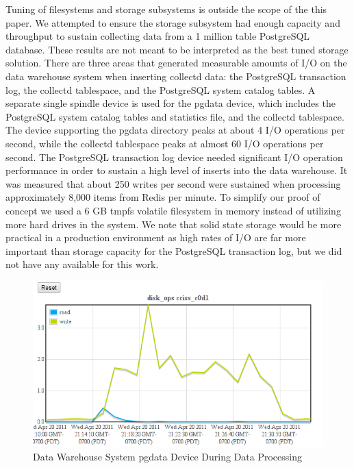 \documentclass[twocolumn,letterpaper]{article}
\begin{document}
Tuning of filesystems and storage subsystems is outside the scope of the this
paper.  We attempted to ensure the storage subsystem had enough capacity and
throughput to sustain collecting data from a 1 million table PostgreSQL
database.  These results are not meant to be interpreted as the best tuned
storage solution.  There are three areas that generated measurable amounts of
I/O on the data warehouse system when inserting collectd data: the PostgreSQL
transaction log, the collectd tablespace, and the PostgreSQL system catalog
tables.  A separate single spindle device is used for the pgdata device, which
includes the PostgreSQL system catalog tables and statistics file, and the
collectd tablespace.  The device supporting the pgdata directory peaks at about
4 I/O operations per second, while the collectd tablespace peaks at almost 60
I/O operations per second.  The PostgreSQL transaction log device needed
significant I/O operation performance in order to sustain a high level of
inserts into the data warehouse.  It was measured that about 250 writes per
second were sustained when processing approximately 8,000 items from Redis per
minute.  To simplify our proof of concept we used a 6 GB tmpfs volatile
filesystem in memory instead of utilizing more hard drives in the system.
We note that solid state storage would be more practical in a production
environment as high rates of I/O are far more important than storage capacity
for the PostgreSQL transaction log, but we did not have any available for this
work.

\begin{figure}[ht]
  \begin{center}
    \includegraphics[scale=0.37]{etl-c6-disk-c0d1-iops}
  \end{center}
  \caption{Data Warehouse System pgdata Device During Data Processing}
  \label{etl-c6-c0d1}
\end{figure}
\end{document}
